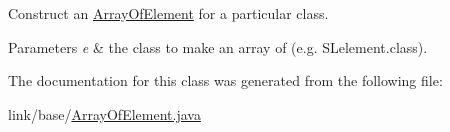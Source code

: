 Construct an \hyperlink{classbridges_1_1base_1_1_array_of_element}{Array\+Of\+Element} for a particular class. 
\begin{DoxyParams}{Parameters}
{\em e} & the class to make an array of (e.\+g. S\+Lelement.\+class). \\
\hline
\end{DoxyParams}


The documentation for this class was generated from the following file\+:\begin{DoxyCompactItemize}
\item 
link/base/\hyperlink{_array_of_element_8java}{Array\+Of\+Element.\+java}\end{DoxyCompactItemize}

